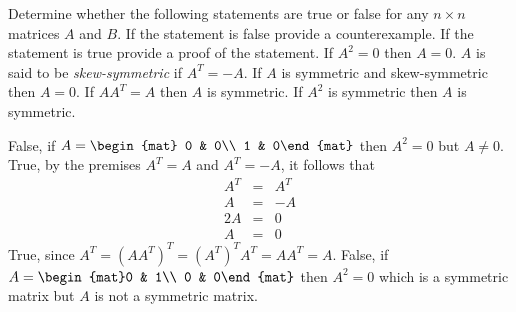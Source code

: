 
\begin{Exercise}[
name={},
title={}, 
difficulty=0,
origin={\cite{BS}}]
Determine whether the following statements are true or false for any $n\times n$
matrices $A$ and $B$.  If the statement is false provide a counterexample. If the
statement is true provide a proof of the statement.
\Question If $A^2=0$ then $A=0$.
\Question $A$ is said to be \emph{skew-symmetric} if $A^T=-A$.  If $A$ is symmetric and skew-symmetric then $A=0$.
\Question If $AA^T=A$ then $A$ is symmetric.
\Question If $A^2$ is symmetric then $A$ is symmetric.
\end{Exercise}

\begin{Answer}
\Question False, if $A=\begin{mat} 0 & 0\\ 1 & 0\end{mat}$ then $A^2=0$ but $A\neq0$. 
\Question True, by the premises $A^T=A$ and $A^T=-A$, it follows that
\begin{eqnarray*}
A^T&=&A^T\\
A &=&-A\\
2A &=& 0\\
A & = &0
\end{eqnarray*}
\Question True, since $A^T=(AA^T)^T=(A^T)^TA^T=AA^T=A$.
\Question False, if $A=\begin{mat}0 & 1\\ 0 & 0\end{mat}$ then $A^2=0$ which is a symmetric matrix but $A$ is not a symmetric matrix.
\end{Answer}
